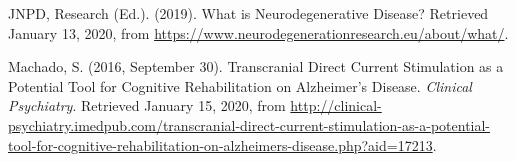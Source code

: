 \begin{thebibliography}{9}
JNPD, Research (Ed.). (2019). What is Neurodegenerative Disease? Retrieved January 13, 2020, 
from \url{https://www.neurodegenerationresearch.eu/about/what/}.

Machado, S. (2016, September 30). Transcranial Direct Current Stimulation as a Potential Tool
for Cognitive Rehabilitation on Alzheimer's Disease. \textit{Clinical Psychiatry}. Retrieved January 15, 2020, from
\url{http://clinical-psychiatry.imedpub.com/transcranial-direct-current-stimulation-as-a-potential-tool-for-cognitive-rehabilitation-on-alzheimers-disease.php?aid=17213}.

\end{thebibliography}
\endgroup
